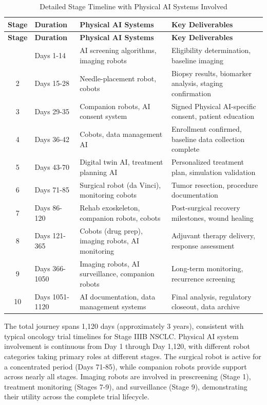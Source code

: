 \begin{longtable}{c l l p{6cm}}
\caption{Detailed Stage Timeline with Physical AI Systems Involved}
\label{tab:journey-timeline} \\
\toprule
\textbf{Stage} & \textbf{Duration} & \textbf{Physical AI Systems} & \textbf{Key Deliverables} \\
\midrule
\endfirsthead
\toprule
\textbf{Stage} & \textbf{Duration} & \textbf{Physical AI Systems} & \textbf{Key Deliverables} \\
\midrule
\endhead
\bottomrule
\endfoot
1 & Days 1-14 & AI screening algorithms, imaging robots & Eligibility determination, baseline imaging \\
2 & Days 15-28 & Needle-placement robot, cobots & Biopsy results, biomarker analysis, staging confirmation \\
3 & Days 29-35 & Companion robots, AI consent system & Signed Physical AI-specific consent, patient education \\
4 & Days 36-42 & Cobots, data management AI & Enrollment confirmed, baseline data collection complete \\
5 & Days 43-70 & Digital twin AI, treatment planning AI & Personalized treatment plan, simulation validation \\
6 & Days 71-85 & Surgical robot (da Vinci), monitoring cobots & Tumor resection, procedure documentation \\
7 & Days 86-120 & Rehab exoskeleton, companion robots, cobots & Post-surgical recovery milestones, wound healing \\
8 & Days 121-365 & Cobots (drug prep), imaging robots, AI monitoring & Adjuvant therapy delivery, response assessment \\
9 & Days 366-1050 & Imaging robots, AI surveillance, companion robots & Long-term monitoring, recurrence screening \\
10 & Days 1051-1120 & AI documentation, data management systems & Final analysis, regulatory closeout, data archive \\
\end{longtable}

The total journey spans 1,120 days (approximately 3 years), consistent with
typical oncology trial timelines for Stage IIIB NSCLC. Physical AI system
involvement is continuous from Day 1 through Day 1,120, with different robot
categories taking primary roles at different stages. The surgical robot is
active for a concentrated period (Days 71-85), while companion robots provide
support across nearly all stages. Imaging robots are involved in prescreening
(Stage 1), treatment monitoring (Stages 7-9), and surveillance (Stage 9),
demonstrating their utility across the complete trial lifecycle.

